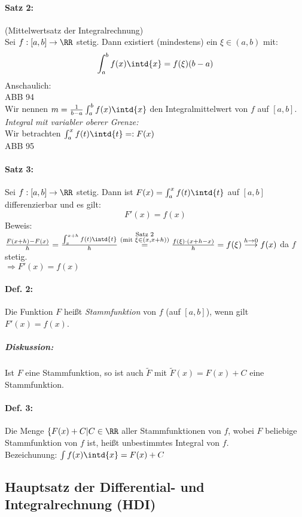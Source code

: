 \paragraph{Satz 2:} (Mittelwertsatz der Integralrechnung)\\
Sei $f: [a,b]\to \RR$ stetig. Dann existiert (mindestens) ein $\xi \in (a,b)$ mit: 
\[\int_a^b f(x)\intd{x}= f(\xi) (b-a)\]
Anschaulich:\\
ABB 94\\
Wir nennen $m=\frac{1}{b-a}\int_a^b f(x) \intd{x}$ den Integralmittelwert von $f$ auf $[a,b]$.\\
\emph{Integral mit variabler oberer Grenze:}\\
Wir betrachten $\int_a^x f(t) \intd{t} =: F(x)$\\
ABB 95
\paragraph{Satz 3:} Sei $f:[a,b]\to \RR$ stetig. Dann ist $F(x)=\int_a^x f(t)\intd{t}$ auf $[a,b]$ differenzierbar und es gilt:
\[F'(x)=f(x)\]
Beweis:\\
$\frac{F(x+h)-F(x)}{h}=\frac{\int_x^{x+h} f(t) \intd{t}}{h}\overset{\substack{\text{Satz 2}\\\text{(mit }\xi\in (x,x+h))}}{=}\frac{f(\xi)\cdot (x+h-x)}{h}=f(\xi)\overset{h\to 0}{\longrightarrow} f(x)$ da $f$ stetig.\\
$\Rightarrow F'(x) = f(x)$
\paragraph{Def. 2:} Die Funktion $F$ heißt \emph{Stammfunktion} von $f$ (auf $[a,b]$), wenn gilt $F'(x)=f(x)$.
\subparagraph{Diskussion:} Ist $F$ eine Stammfunktion, so ist auch $\tilde{F}$ mit $\tilde{F}(x)=F(x)+C$ eine Stammfunktion.
\paragraph{Def. 3:} Die Menge $\{F(x)+C|C\in \RR$ aller Stammfunktionen von $f$, wobei $F$ beliebige Stammfunktion von $f$ ist, heißt unbestimmtes Integral von $f$.\\
Bezeichunung: $\int f(x) \intd{x}=F(x)+C$
\subsection{Hauptsatz der Differential- und Integralrechnung (HDI)}
